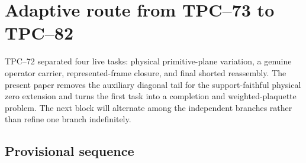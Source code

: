 \section{Adaptive route from TPC--73 to TPC--82}
\label{sec:route-plan}

TPC--72 separated four live tasks: physical primitive-plane variation, a
genuine operator carrier, represented-frame closure, and final shorted
reassembly.  The present paper removes the auxiliary diagonal tail for the
support-faithful physical zero extension and turns the first task into a
completion and weighted-plaquette problem.  The next block will alternate
among the independent
branches rather than refine one branch indefinitely.

\subsection{Provisional sequence}

